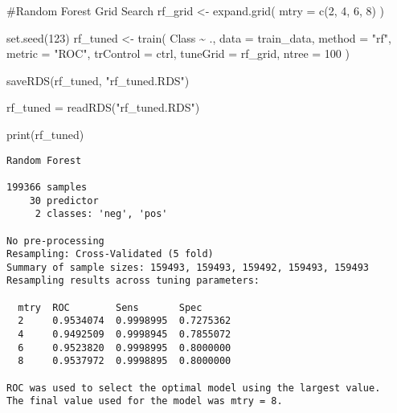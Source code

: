 \documentclass[
  11pt,
  letterpaper,
  DIV=11,
  numbers=noendperiod]{scrartcl}
\newenvironment{Shaded}{}{}
\newcommand{\AttributeTok}[1]{\textcolor[rgb]{0.84,0.23,0.29}{#1}}
\newcommand{\CommentTok}[1]{\textcolor[rgb]{0.42,0.45,0.49}{#1}}
\newcommand{\DecValTok}[1]{\textcolor[rgb]{0.00,0.36,0.77}{#1}}
\newcommand{\FunctionTok}[1]{\textcolor[rgb]{0.44,0.26,0.76}{#1}}
\newcommand{\NormalTok}[1]{\textcolor[rgb]{0.14,0.16,0.18}{#1}}
\newcommand{\OtherTok}[1]{\textcolor[rgb]{0.44,0.26,0.76}{#1}}
\newcommand{\SpecialCharTok}[1]{\textcolor[rgb]{0.00,0.36,0.77}{#1}}
\newcommand{\StringTok}[1]{\textcolor[rgb]{0.01,0.18,0.38}{#1}}
\begin{document}
\begin{Shaded}
\begin{Highlighting}[]
\CommentTok{\#Random Forest Grid Search}
\NormalTok{rf\_grid }\OtherTok{\textless{}{-}} \FunctionTok{expand.grid}\NormalTok{(}
  \AttributeTok{mtry =} \FunctionTok{c}\NormalTok{(}\DecValTok{2}\NormalTok{, }\DecValTok{4}\NormalTok{, }\DecValTok{6}\NormalTok{, }\DecValTok{8}\NormalTok{)}
\NormalTok{)}

\FunctionTok{set.seed}\NormalTok{(}\DecValTok{123}\NormalTok{)}
\NormalTok{rf\_tuned }\OtherTok{\textless{}{-}} \FunctionTok{train}\NormalTok{(}
\NormalTok{  Class }\SpecialCharTok{\textasciitilde{}}\NormalTok{ .,}
  \AttributeTok{data      =}\NormalTok{ train\_data,}
  \AttributeTok{method    =} \StringTok{"rf"}\NormalTok{,}
  \AttributeTok{metric    =} \StringTok{"ROC"}\NormalTok{,}
  \AttributeTok{trControl =}\NormalTok{ ctrl,}
  \AttributeTok{tuneGrid  =}\NormalTok{ rf\_grid,}
  \AttributeTok{ntree     =} \DecValTok{100}
\NormalTok{)}

\FunctionTok{saveRDS}\NormalTok{(rf\_tuned, }\StringTok{"rf\_tuned.RDS"}\NormalTok{)}
\end{Highlighting}
\end{Shaded}

\begin{Shaded}
\begin{Highlighting}[]
\NormalTok{rf\_tuned }\OtherTok{=} \FunctionTok{readRDS}\NormalTok{(}\StringTok{"rf\_tuned.RDS"}\NormalTok{)}

\FunctionTok{print}\NormalTok{(rf\_tuned)}
\end{Highlighting}
\end{Shaded}

\begin{verbatim}
Random Forest 

199366 samples
    30 predictor
     2 classes: 'neg', 'pos' 

No pre-processing
Resampling: Cross-Validated (5 fold) 
Summary of sample sizes: 159493, 159493, 159492, 159493, 159493 
Resampling results across tuning parameters:

  mtry  ROC        Sens       Spec     
  2     0.9534074  0.9998995  0.7275362
  4     0.9492509  0.9998945  0.7855072
  6     0.9523820  0.9998995  0.8000000
  8     0.9537972  0.9998895  0.8000000

ROC was used to select the optimal model using the largest value.
The final value used for the model was mtry = 8.
\end{verbatim}
\end{document}
